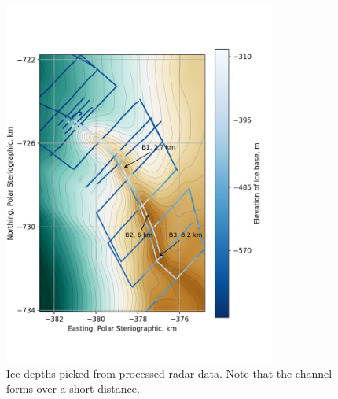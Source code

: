 \label{ch:appendix}


\begin{figure}[!ht]
\centering
\includegraphics[width=0.8\textwidth]{chapters/2/radarlines_surfcolour.png}
\caption[Radar line depths]{Ice depths picked from processed radar data. Note that the channel forms over a short distance.}
\label{fig:radarlines_surfcoloure}
\end{figure}



